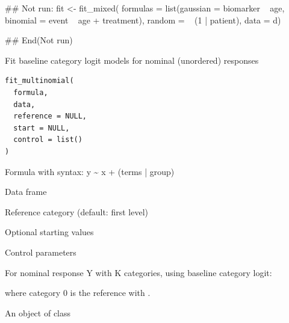 \documentclass[a4paper]{book}
\begin{document}
%
\begin{Examples}
\begin{ExampleCode}
## Not run: 
fit <- fit_mixed(
  formulas = list(gaussian = biomarker ~ age,
                  binomial = event ~ age + treatment),
  random = ~ (1 | patient),
  data = d)

## End(Not run)

\end{ExampleCode}
\end{Examples}
%
\begin{Description}
Fit baseline category logit models for nominal (unordered) responses
\end{Description}
%
\begin{Usage}
\begin{verbatim}
fit_multinomial(
  formula,
  data,
  reference = NULL,
  start = NULL,
  control = list()
)
\end{verbatim}
\end{Usage}
%
\begin{Arguments}
\begin{ldescription}
\item[\code{formula}] Formula with syntax: y \textasciitilde{} x + (terms | group)

\item[\code{data}] Data frame

\item[\code{reference}] Reference category (default: first level)

\item[\code{start}] Optional starting values

\item[\code{control}] Control parameters
\end{ldescription}
\end{Arguments}
%
\begin{Details}
For nominal response Y with K categories, using baseline category logit:


where category 0 is the reference with .
\end{Details}
%
\begin{Value}
An object of class 
\end{Value}
%
\begin{Examples}
\end{Examples}
\end{document}
